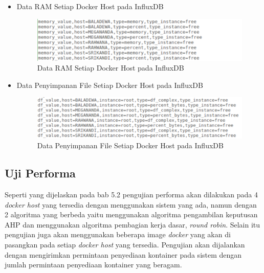 \begin{itemize}
\item Data RAM Setiap Docker Host pada InfluxDB
\begin{figure}[H]
        \centering
        \includegraphics[width=\linewidth]{images/bab5/dataram}
        \caption{Data RAM Setiap Docker Host pada InfluxDB}
        \label{DataRam}
      \end{figure} 
\end{itemize}
\begin{itemize}
\item Data Penyimpanan File Setiap Docker Host pada InfluxDB
\begin{figure}[H]
        \centering
        \includegraphics[width=\linewidth]{images/bab5/datadf}
        \caption{Data Penyimpanan File Setiap Docker Host pada InfluxDB}
        \label{DataDf}
      \end{figure} 
\end{itemize}


      \subsection{Uji Performa}
 Seperti yang dijelaskan pada bab 5.2 pengujian performa akan dilakukan pada 4 \textit{docker host} yang tersedia dengan menggunakan sistem yang ada, namun dengan 2 algoritma yang berbeda yaitu menggunakan algoritma pengambilan keputusan AHP dan menggunakan algoritma pembagian kerja dasar, \textit{round robin}\cite{shreedhar_efficient_1996}. Selain itu pengujian juga akan menggunakan beberapa image \textit{docker} yang akan di pasangkan pada setiap \textit{docker host} yang tersedia. Pengujian akan dijalankan dengan mengirimkan permintaan penyediaan kontainer pada sistem dengan jumlah permintaan penyediaan kontainer yang beragam.

